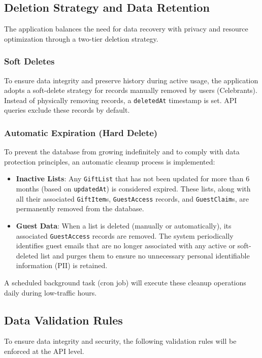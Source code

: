 \subsection{Deletion Strategy and Data Retention}
The application balances the need for data recovery with privacy and resource optimization through a two-tier deletion strategy.

\subsubsection{Soft Deletes}
To ensure data integrity and preserve history during active usage, the application adopts a soft-delete strategy for records manually removed by users (Celebrants). Instead of physically removing records, a \texttt{deletedAt} timestamp is set. API queries exclude these records by default.

\subsubsection{Automatic Expiration (Hard Delete)}
To prevent the database from growing indefinitely and to comply with data protection principles, an automatic cleanup process is implemented:
\begin{itemize}
    \item \textbf{Inactive Lists}: Any \texttt{GiftList} that has not been updated for more than 6 months (based on \texttt{updatedAt}) is considered expired. These lists, along with all their associated \texttt{GiftItem}s, \texttt{GuestAccess} records, and \texttt{GuestClaim}s, are permanently removed from the database.
    \item \textbf{Guest Data}: When a list is deleted (manually or automatically), its associated \texttt{GuestAccess} records are removed. The system periodically identifies guest emails that are no longer associated with any active or soft-deleted list and purges them to ensure no unnecessary personal identifiable information (PII) is retained.
\end{itemize}

A scheduled background task (cron job) will execute these cleanup operations daily during low-traffic hours.

\subsection{Data Validation Rules}
To ensure data integrity and security, the following validation rules will be enforced at the API level.

